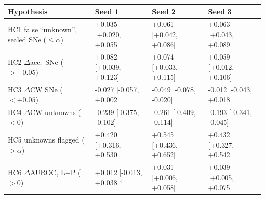 \begin{tabular}{llll}
\toprule
Hypothesis & Seed 1 & Seed 2 & Seed 3 \\
\midrule
HC1 false ``unknown'', sealed SNe ($\leq\alpha$) & +0.035 [+0.020, +0.055] & +0.061 [+0.042, +0.086] & +0.063 [+0.043, +0.089] \\
HC2 $\Delta$acc.\ SNe ($>-0.05$) & +0.082 [+0.039, +0.123] & +0.074 [+0.033, +0.115] & +0.059 [+0.012, +0.106] \\
HC3 $\Delta$CW SNe ($<+0.05$) & -0.027 [-0.057, +0.002] & -0.049 [-0.078, -0.020] & -0.012 [-0.043, +0.018] \\
HC4 $\Delta$CW unknowns ($<0$) & -0.239 [-0.375, -0.102] & -0.261 [-0.409, -0.114] & -0.193 [-0.341, -0.045] \\
HC5 unknowns flagged ($>\alpha$) & +0.420 [+0.316, +0.530] & +0.545 [+0.436, +0.652] & +0.432 [+0.327, +0.542] \\
HC6 $\Delta$AUROC, L$-$P ($>0$) & +0.012 [-0.013, +0.038]$^\times$ & +0.031 [+0.006, +0.058] & +0.039 [+0.005, +0.075] \\
\bottomrule
\end{tabular}

